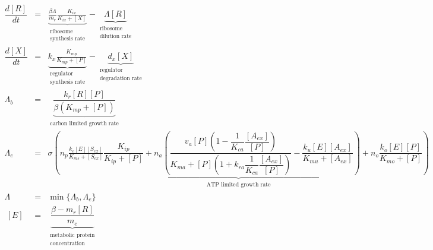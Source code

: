 \documentclass[11pt]{article}
\begin{document}
{\begin{eqnarray*}
	\dfrac{d [R]}{d t} &=& \underbrace{\frac{\beta \Lambda}{m_r}\frac{K_{ix}}{K_{ix}+[X]}}_{\substack{\text{ribosome} \\ \text{synthesis rate}}}-\underbrace{\Lambda[R]}_{\substack{\text{ribosome} \\ \text{dilution rate}}} \label{eq:drdt_summary1} \\
	\dfrac{d [X]}{d t} &=& \underbrace{k_x\frac{K_{mp}}{K_{mp}+[P]}}_{\substack{\text{regulator}\\\text{synthesis rate}}}-\underbrace{d_{x}[X]}_{\substack{\text{regulator}\\
 \text{degradation rate}}} ~\label{eq:dgdt_summary1}\\
	\Lambda_{b} &=& \underbrace{\dfrac{k_r[R][P]}{\beta(K_{mp}+[P])}}_{\substack{\text{carbon limited growth rate}}} \label{eq:growth_rate_summary1}\\
	\Lambda_{e} &=& \underbrace{\sigma \left(n_p\frac{k_e[E][S_{ex}]}{K_{ms}+[S_{ex}]}\dfrac{K_{ip}}{K_{ip}+[P]}+n_a\left(\dfrac{v_a[P]\left(1-\dfrac{1}{K_{ca}}\dfrac{[A_{ex}]}{[P]}\right)}{K_{ma}+[P]\left(1+k_{ra}\dfrac{1}{K_{ca}}\dfrac{[A_{ex}]}{[P]}\right)}-\dfrac{k_u[E][A_{ex}]}{K_{mu}+[A_{ex}]}\right)+n_o\dfrac{k_o[E][P]}{K_{mo}+[P]}\right)}_{\substack{\text{ATP limited growth rate}}} \label{eq:growth_rate_summary11}\\
	\Lambda &=& \min\{\Lambda_{b}, \Lambda_{e}\} \\ 
   ~[E] &=& \underbrace{\dfrac{\beta-m_r[R]}{m_e}}_{\substack{\text{metabolic protein} \\ \text{concentration}}} \label{eq:metab_prot_conc1}
  \end{eqnarray*}
  
}
\end{document}
